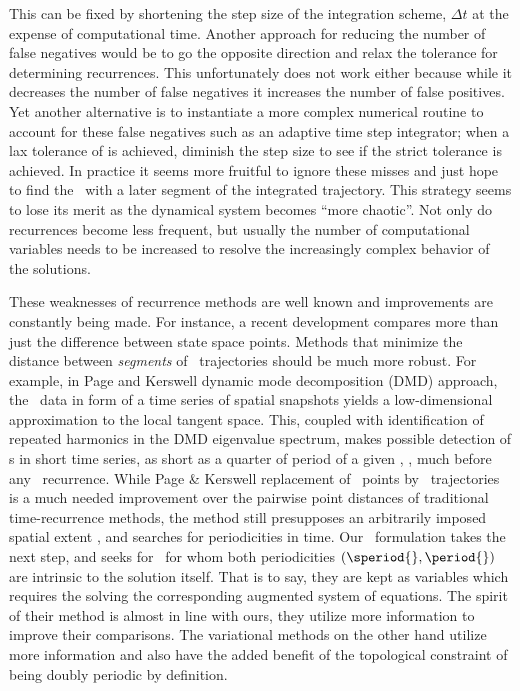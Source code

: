 This can be fixed by shortening the step
size of the integration scheme, $\Delta t$
at the expense of computational time.
Another approach for reducing the number
of false negatives would be to go the opposite
direction and relax the tolerance
for determining recurrences.
This unfortunately does not
work either because while it decreases the number of false
negatives it increases the number of false
positives.
Yet another alternative is to instantiate a more complex
numerical routine to account for these false negatives
such as an adaptive time step integrator; when a
lax tolerance of  is achieved,
diminish the step size to see if the strict
tolerance is achieved. In practice
it seems more fruitful to ignore these misses and
just hope to find the \po\ with a later segment of
the integrated trajectory. This strategy seems to
lose its merit as the dynamical system becomes ``more chaotic''.
Not only do recurrences become less frequent, but usually
the number of computational variables needs to be
increased to resolve the increasingly complex behavior
of the solutions.

These weaknesses of recurrence methods are well known
and improvements are constantly being made.
For instance, a recent development compares
more than just the difference between state space points.
                    \toCB
Methods that minimize the distance between \emph{segments} of \statesp\
trajectories should be much more robust.
For example, in Page and Kerswell dynamic mode decomposition
(DMD)\rf{Schmid10,Schmid11} approach, the \spt\ data in form of a time
series of spatial snapshots yields a low-dimensional approximation to the
local tangent space. This, coupled with identification of repeated
harmonics in the DMD eigenvalue spectrum, makes possible detection of \po
s in short time series, as short as a quarter of period of a given \po,
\ie, much before any \statesp\ recurrence.
While Page \& Kerswell replacement of \statesp\ points by \statesp\
trajectories is a much needed improvement over the pairwise point
distances of traditional time-recurrence methods, the method still
presupposes an arbitrarily imposed spatial extent \speriod{}, and searches
for periodicities \period{} in time. Our \spt\ formulation takes the next
step, and seeks for \twots\ for whom both periodicities
$(\speriod{},\period{})$ are intrinsic to the solution itself. That is to say,
they are kept as variables which requires the solving
the corresponding augmented system of equations. The spirit of
their method is almost in line with ours,
they utilize more information to improve their comparisons.
The variational methods on the other hand
utilize more information and also
have the added benefit of the topological constraint of being
doubly periodic by definition.

